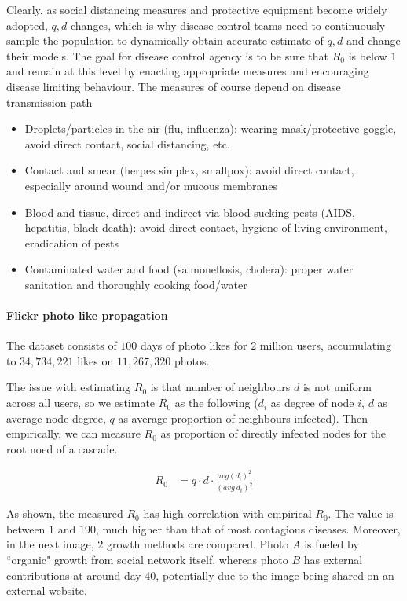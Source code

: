 Clearly, as social distancing measures and protective equipment become widely adopted, $q, d$ changes, which is why disease control teams need to continuously sample the population to dynamically obtain accurate estimate of $q, d$ and change their models. The goal for disease control agency is to be sure that $R_0$ is below $1$ and remain at this level by enacting appropriate measures and encouraging disease limiting behaviour. The measures of course depend on disease transmission path

\begin{itemize}
    \item Droplets/particles in the air (flu, influenza): wearing mask/protective goggle, avoid direct contact, social distancing, etc.
    
    \item Contact and smear (herpes simplex, smallpox): avoid direct contact, especially around wound and/or mucous membranes
    
    \item Blood and tissue, direct and indirect via blood-sucking pests (AIDS, hepatitis, black death): avoid direct contact, hygiene of living environment, eradication of pests
    
    \item Contaminated water and food (salmonellosis, cholera): proper water sanitation and thoroughly cooking food/water
\end{itemize}{}

\paragraph{Flickr photo like propagation} The dataset consists of $100$ days of photo likes for $2$ million users, accumulating to $34,734,221$ likes on $11,267,320$ photos. 

The issue with estimating $R_0$ is that number of neighbours $d$ is not uniform across all users, so we estimate $R_0$ as the following ($d_i$ as degree of node $i$, $d$ as average node degree, $q$ as average proportion of neighbours infected). Then empirically, we can measure $R_0$ as proportion of directly infected nodes for the root noed of a cascade. 

\begin{align}
    R_0 &= q \cdot d \cdot \frac{avg(d_i)^2}{(avg\ d_i)^2}
\end{align}{}

As shown, the measured $R_0$ has high correlation with empirical $R_0$. The value is between $1$ and $190$, much higher than that of most contagious diseases. Moreover, in the next image, $2$ growth methods are compared. Photo $A$ is fueled by ``organic" growth from social network itself, whereas photo $B$ has external contributions at around day $40$, potentially due to the image being shared on an external website. 

